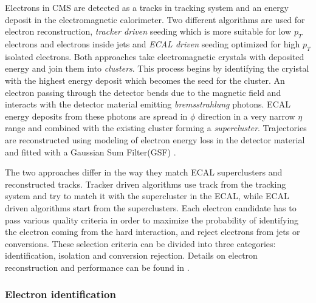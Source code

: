 Electrons in CMS are detected as a tracks in tracking system and an energy deposit in the electromagnetic calorimeter. Two different algorithms are used for electron reconstruction, \textit{tracker driven} seeding which is more suitable for low $p_T$ electrons and electrons inside jets and \textit{ECAL driven} seeding optimized for high $p_T$ isolated electrons. Both approaches take electromagnetic crystals with deposited energy and join them into \textit{clusters}. This process begins by identifying the cryistal with the highest energy deposit which becomes the seed for the cluster. An electron passing through the detector bends due to the magnetic field and interacts with the detector material emitting \textit{bremsstrahlung} photons. ECAL energy deposits from these photons are spread in $\phi$ direction in a very narrow $\eta$ range and combined with the existing cluster forming a \textit{supercluster}. Trajectories are reconstructed using modeling of electron energy loss in the detector material and fitted with a Gaussian Sum Filter(GSF) \cite{2005JPhG31N9A}.
\par The two approaches differ in the way they match ECAL superclusters and reconstructed tracks. Tracker driven algorithms use track from the tracking system and try to match it with the supercluster in the ECAL, while ECAL driven algorithms start from the superclusters.
Each electron candidate has to pass various quality criteria in order to maximize the probability of identifying the electron coming from the hard interaction, and reject electrons from jets or conversions. These selection criteria can be divided into three categories: identification, isolation and conversion rejection. Details on electron reconstruction and performance can be found in \cite{CMS:2010bta}.

\subsubsection*{Electron identification}
\label{sec:eleID}

